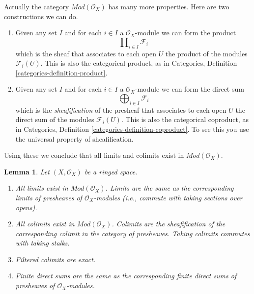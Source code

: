\documentclass{stacks-project}
\theoremstyle{plain}
\newtheorem{lemma}[subsection]{Lemma}
\theoremstyle{definition}
\theoremstyle{remark}
\numberwithin{equation}{subsection}
\begin{document}
\noindent
Actually the category $\textit{Mod}(\mathcal{O}_X)$ has many more properties.
Here are two constructions we can do.
\begin{enumerate}
\item Given any set $I$ and for each $i \in I$ a $\mathcal{O}_X$-module
we can form the product
$$
\prod\nolimits_{i \in I} \mathcal{F}_i
$$
which is the sheaf that associates to each open $U$ the
product of the modules $\mathcal{F}_i(U)$. This is also the
categorical product, as in
Categories, Definition \ref{categories-definition-product}.
\item Given any set $I$ and for each $i \in I$ a $\mathcal{O}_X$-module
we can form the direct sum
$$
\bigoplus\nolimits_{i \in I} \mathcal{F}_i
$$
which is the {\it sheafification} of the presheaf
that associates to each open $U$ the
direct sum of the modules $\mathcal{F}_i(U)$.
This is also the categorical coproduct, as in
Categories, Definition \ref{categories-definition-coproduct}.
To see this you use the universal property of sheafification.
\end{enumerate}
Using these we conclude that all limits and colimits exist in
$\textit{Mod}(\mathcal{O}_X)$.

\begin{lemma}
\label{lemma-limits-colimits}
Let $(X, \mathcal{O}_X)$ be a ringed space.
\begin{enumerate}
\item All limits exist in $\textit{Mod}(\mathcal{O}_X)$.
Limits are the same as the corresponding limits of presheaves of
$\mathcal{O}_X$-modules (i.e., commute with taking
sections over opens).
\item All colimits exist in $\textit{Mod}(\mathcal{O}_X)$.
Colimits are the sheafification of the corresponding colimit in
the category of presheaves. Taking colimits commutes with taking
stalks.
\item Filtered colimits are exact.
\item Finite direct sums are the same as the corresponding
finite direct sums of presheaves of $\mathcal{O}_X$-modules.
\end{enumerate}
\end{lemma}
\end{document}

